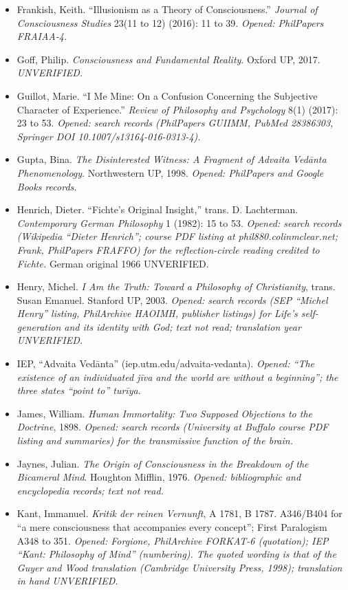 \documentclass[11pt]{article}
\begin{document}
\begin{itemize}
\item Frankish, Keith. ``Illusionism as a Theory of Consciousness.'' \emph{Journal of Consciousness Studies} 23(11 to 12) (2016): 11 to 39. \emph{Opened: PhilPapers FRAIAA-4.}
\item Goff, Philip. \emph{Consciousness and Fundamental Reality}. Oxford UP, 2017. \emph{UNVERIFIED.}
\item Guillot, Marie. ``I Me Mine: On a Confusion Concerning the Subjective Character of Experience.'' \emph{Review of Philosophy and Psychology} 8(1) (2017): 23 to 53. \emph{Opened: search records (PhilPapers GUIIMM, PubMed 28386303, Springer DOI 10.1007/\allowbreak{}s13164-016-0313-4).}
\item Gupta, Bina. \emph{The Disinterested Witness: A Fragment of Advaita Vedānta Phenomenology}. Northwestern UP, 1998. \emph{Opened: PhilPapers and Google Books records.}
\item Henrich, Dieter. ``Fichte's Original Insight,'' trans. D. Lachterman. \emph{Contemporary German Philosophy} 1 (1982): 15 to 53. \emph{Opened: search records (Wikipedia ``Dieter Henrich''; course PDF listing at phil880.colinmclear.net; Frank, PhilPapers FRAFFO) for the reflection-circle reading credited to Fichte.} German original 1966 UNVERIFIED.
\item Henry, Michel. \emph{I Am the Truth: Toward a Philosophy of Christianity}, trans. Susan Emanuel. Stanford UP, 2003. \emph{Opened: search records (SEP ``Michel Henry'' listing, PhilArchive HAOIMH, publisher listings) for Life's self-generation and its identity with God; text not read; translation year UNVERIFIED.}
\item IEP, ``Advaita Vedānta'' (iep.utm.edu/\allowbreak{}advaita-vedanta). \emph{Opened: ``The existence of an individuated jīva and the world are without a beginning''; the three states ``point to'' turīya.}
\item James, William. \emph{Human Immortality: Two Supposed Objections to the Doctrine}, 1898. \emph{Opened: search records (University at Buffalo course PDF listing and summaries) for the transmissive function of the brain.}
\item Jaynes, Julian. \emph{The Origin of Consciousness in the Breakdown of the Bicameral Mind}. Houghton Mifflin, 1976. \emph{Opened: bibliographic and encyclopedia records; text not read.}
\item Kant, Immanuel. \emph{Kritik der reinen Vernunft}, A 1781, B 1787. A346/\allowbreak{}B404 for ``a mere consciousness that accompanies every concept''; First Paralogism A348 to 351. \emph{Opened: Forgione, PhilArchive FORKAT-6 (quotation); IEP ``Kant: Philosophy of Mind'' (numbering). The quoted wording is that of the Guyer and Wood translation (Cambridge University Press, 1998); translation in hand UNVERIFIED.}

\end{itemize}
\end{document}
